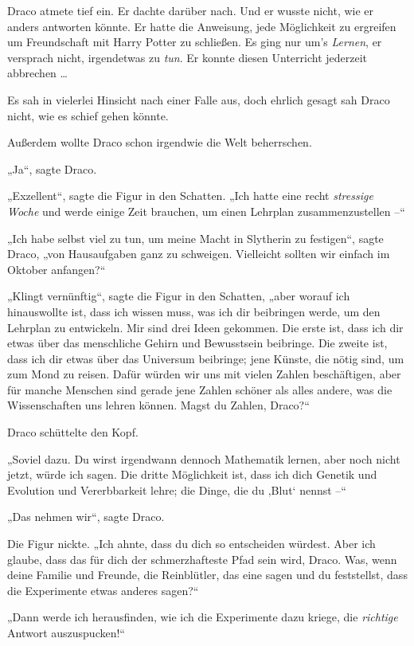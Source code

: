 {Draco atmete tief ein. Er dachte darüber nach. Und er wusste nicht, wie er anders antworten könnte. Er hatte die Anweisung, jede Möglichkeit zu ergreifen um Freundschaft mit Harry Potter zu schließen. Es ging nur um's \emph{Lernen}, er versprach nicht, irgendetwas zu \emph{tun}. Er konnte diesen Unterricht jederzeit abbrechen …

Es sah in vielerlei Hinsicht nach einer Falle aus, doch ehrlich gesagt sah Draco nicht, wie es schief gehen könnte.

Außerdem wollte Draco schon irgendwie die Welt beherrschen.

„Ja“, sagte Draco.

„Exzellent“, sagte die Figur in den Schatten. „Ich hatte eine recht \emph{stressige Woche} und werde einige Zeit brauchen, um einen Lehrplan zusammenzustellen --“

„Ich habe selbst viel zu tun, um meine Macht in Slytherin zu festigen“, sagte Draco, „von Hausaufgaben ganz zu schweigen. Vielleicht sollten wir einfach im Oktober anfangen?“

„Klingt vernünftig“, sagte die Figur in den Schatten, „aber worauf ich hinauswollte ist, dass ich wissen muss, was ich dir beibringen werde, um den Lehrplan zu entwickeln. Mir sind drei Ideen gekommen. Die erste ist, dass ich dir etwas über das menschliche Gehirn und Bewusstsein beibringe. Die zweite ist, dass ich dir etwas über das Universum beibringe; jene Künste, die nötig sind, um zum Mond zu reisen. Dafür würden wir uns mit vielen Zahlen beschäftigen, aber für manche Menschen sind gerade jene Zahlen schöner als alles andere, was die Wissenschaften uns lehren können. Magst du Zahlen, Draco?“

Draco schüttelte den Kopf.

„Soviel dazu. Du wirst irgendwann dennoch Mathematik lernen, aber noch nicht jetzt, würde ich sagen. Die dritte Möglichkeit ist, dass ich dich Genetik und Evolution und Vererbbarkeit lehre; die Dinge, die du ‚Blut` nennst --“

„Das nehmen wir“, sagte Draco.

Die Figur nickte. „Ich ahnte, dass du dich so entscheiden würdest. Aber ich glaube, dass das für dich der schmerzhafteste Pfad sein wird, Draco. Was, wenn deine Familie und Freunde, die Reinblütler, das eine sagen und du feststellst, dass die Experimente etwas anderes sagen?“

„Dann werde ich herausfinden, wie ich die Experimente dazu kriege, die \emph{richtige} Antwort auszuspucken!“

}
